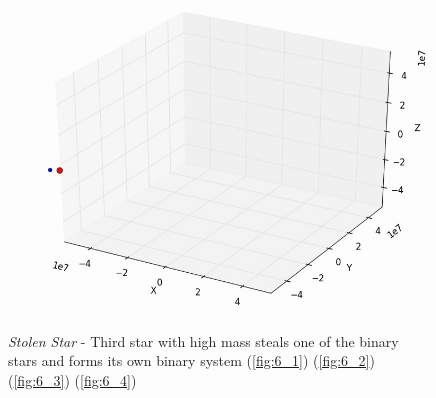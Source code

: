\documentclass[10pt,letterpaper]{article}
\begin{document}
\begin{figure}[!htb]
  \subcaption{}\label{fig:6_3}
\endminipage
{}
  \includegraphics[width=\linewidth]{figures/three_body/6_4.png}
  \subcaption{}\label{fig:6_4}
\endminipage
\caption{ \textit{Stolen Star} - Third star with high mass steals one of the binary stars and forms its own binary system
(\ref{fig:6_1}) 
(\ref{fig:6_2}) 
(\ref{fig:6_3}) 
(\ref{fig:6_4})}\label{fig:6}
\end{figure}
\end{document}
